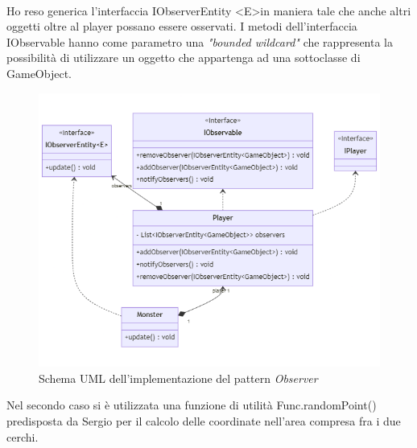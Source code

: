\documentclass[a4paper,12pt]{report}
\begin{document}
\begin{enumerate}
\paragraph{}
Ho reso generica l'interfaccia IObserverEntity \textless E\textgreater \space in maniera tale che anche altri oggetti oltre al player possano essere osservati. I metodi dell'interfaccia IObservable hanno come parametro una \emph{"bounded wildcard"} che rappresenta la possibilità di utilizzare un oggetto che appartenga ad una sottoclasse di GameObject. 
 

\begin{figure}[H]
	\centering{}
\includegraphics[width=\textwidth]{img/monsterObserver.png}
	\caption{Schema UML dell'implementazione del pattern \emph{Observer}}
\label{img:Observer Pattern}
\end{figure}

Nel secondo caso si è utilizzata una funzione di utilità Func.randomPoint() predisposta da Sergio per il calcolo delle coordinate nell'area compresa fra i due cerchi.	


\end{enumerate}
\end{document}
